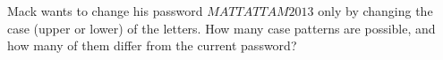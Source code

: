Mack wants to change his password $MATTATTAM2013$ only by changing the case (upper or lower) of the letters. How many case patterns are possible, and how many of them differ from the current password?
